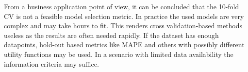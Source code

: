 \documentclass[english, 12pt, a4paper, sci, utf8, a-1b, online]{aaltothesis}
\begin{document}
From a business application point of view, it can be concluded that the 10-fold CV is not a feasible model selection metric. In practice the used models are very complex and may take hours to fit. This renders cross validation-based methods useless as the results are often needed rapidly. If the dataset has enough datapoints, hold-out based metrics like MAPE and others with possibly different utility functions may be used. In a scenario with limited data availability the information criteria may suffice.



\end{document}
